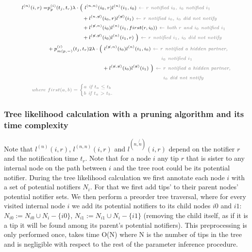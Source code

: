 \documentclass[10pt,letterpaper]{article}
\begin{document}
\begin{equation}
\scriptsize
\begin{split}
l^{(n)}(i, r) = &p_{p}^{(i)}(t_j,t_r) \lambda \cdot
\Big(~l^{(n,n)}(i_0,r)l^{(n)}(i_1,i_0) \textit{\color{gray}~$\leftarrow$ $r$ notified $i_0$, $i_0$  notified $i_1$} \\
&~~~~~~~~~~~~~~~~~~~+ l^{(n,\not{n})}(i_0,r)l^{(\not{n})}(i_1) \textit{\color{gray}~$\leftarrow$  $r$ notified $i_0$, $i_0$ did not notify} \\
&~~~~~~~~~~~~~~~~~~~+l^{(\not{n}, n)}(i_0)l^{(n)}(i_1,first(r,i_0)) \textit{\color{gray}~$\leftarrow$ both $r$ and $i_0$ notified $i_1$} \\
&~~~~~~~~~~~~~~~~~~~+ l^{(\not{n},\not{n})}(i_0)l^{(n)}(i_1,r)~\Big) \textit{\color{gray}~$\leftarrow$ $r$ notified $i_1$, $i_0$ did not notify} 
\\
&+ p_{m(p,-)}^{(i)}(t_j,t_r) 2\lambda \cdot
\Big(~l^{(\not{n},n)}(i_0)l^{(n)}(i_1,i_0) \textit{\color{gray}~$\leftarrow$ $r$ notified a hidden partner,} \\
&\textit{\color{gray}~~~~~~~~~~~~~~~~~~~~~~~~~~~~~~~~~~~~~~~~~~~~~~~~~~~~~~~~$i_0$ notified $i_1$} \\
&~~~~~~~~~~~~~~~~~~~~~~~~~~~~~~+ l^{(\not{n},\not{n})}(i_0)l^{(\not{n})}(i_1)~\Big) \textit{\color{gray}~$\leftarrow$ $r$ notified a hidden partner,} \\
&\textit{\color{gray}~~~~~~~~~~~~~~~~~~~~~~~~~~~~~~~~~~~~~~~~~~~~~~~~~~~~~~~~ $i_0$ did not notify}\\
\textit{\color{gray}~where } &\color{gray}first(a,b) = 
\begin{cases}
a \textit{~if $t_a \leq t_b$}\\
b \textit{~if $t_a > t_b$.}
\end{cases} 
 \end{split}
\label{eq:lp-tip-int}
\end{equation}

\subsubsection*{Tree likelihood calculation with a pruning algorithm and its time complexity} 
Note that $l^{(n)}(i, r)$, $l^{(n,n)}(i, r)$ and $l^{(n,\not{n})}(i, r)$ depend on the notifier $r$ and the notification time $t_r$. Note that for a node $i$ any tip $r$ that is sister to any internal node on the path between $i$ and the tree root could be its potential notifier. During the tree likelihood calculation we first annotate each node $i$ with a set of potential notifiers $N_i$. For that we first add tips' to their parent nodes'  potential notifier sets. We then perform a preorder tree traversal, where for every visited internal node $i$ we add its potential notifiers to its child nodes $i0$ and $i1$: $N_{i0} := N_{i0} \cup N_i - \{i0\}$, $N_{i1} := N_{i1} \cup N_i - \{i1\}$ (removing the child itself, as if it is a tip it will be found among its parent's potential notifiers). This preprocessing is only performed once, takes time O(N) where N is the number of tips in the tree and is negligible with respect to the rest of the parameter inference procedure. 
\end{document}
